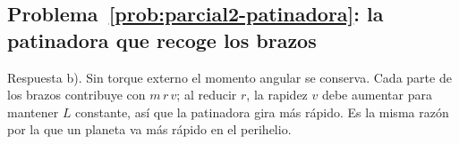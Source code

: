 \subsection*{Problema~\ref{prob:parcial2-patinadora}: la patinadora que recoge los brazos}
\label{sol:parcial2-patinadora}

Respuesta b). Sin torque externo el momento angular se conserva. Cada parte
de los brazos contribuye con $m\,r\,v$; al reducir $r$, la rapidez $v$ debe
aumentar para mantener $L$ constante, así que la patinadora gira más rápido.
Es la misma razón por la que un planeta va más rápido en el perihelio.
